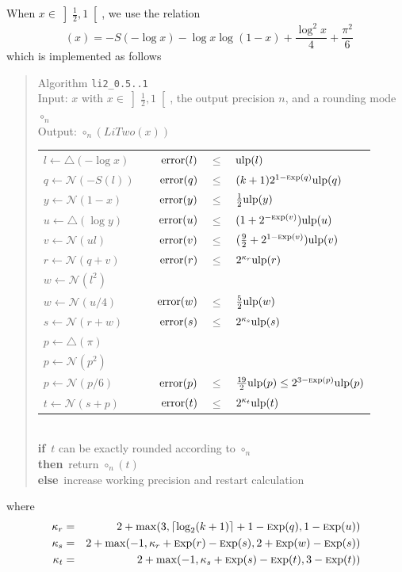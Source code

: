 \documentclass[12pt]{amsart}
\DeclareMathOperator{\LiTwo}{Li_2}
\def\n{\textnormal}
\def\pinf{\bigtriangleup}
\def\ulp{{\rm ulp}}
\def\Exp{{\rm \textsc exp}}
\def\N{{\mathcal N}}
\def\If{{\bf if}}
\def\then{{\bf then}}
\def\Else{{\bf else}}
\begin{document}
When $x \in \left]\frac{1}{2}, 1\right[$, we use the relation
\[
\LiTwo(x) = - S(-\log x) - \log x \log(1 - x) + \frac{\log^2 x}{4}
+ \frac{\pi^2}{6}
\]
which is implemented as follows
\begin{quote}
Algorithm {\tt li2\_0.5..1}\\
Input: $x$ with $x \in \left]\frac{1}{2}, 1\right[$, the output precision $n$,
    and a rounding mode $\circ_n$ \\
Output: $\circ_n(LiTwo(x))$ \\
\begin{tabular}{l c r c l}
$l \leftarrow \pinf(-\log x)$ & & $\n{error}(l) $ & $ \leq $ & $ \ulp(l)$\\
$q \leftarrow \N(-S(l))$ & &
$\n{error}(q) $ & $ \leq $ & $ (k+1)2^{1-\Exp(q)} \ulp(q)$\\

$y \leftarrow \N(1 - x)$ & &
$\n{error}(y) $ & $ \leq $ & $ \frac{1}{2}\ulp(y)$ \\
$u \leftarrow \pinf(\log y)$ & &
$\n{error}(u) $ & $ \leq $ & $(1 + 2^{-\Exp(v)}) \ulp(u)$\\
$v \leftarrow \N(ul)$ & &
$\n{error}(v) $ & $ \leq $ & $(\frac{9}{2} + 2^{1-\Exp(v)}) \ulp(v)$\\
$r \leftarrow \N(q + v)$ & &
$\n{error}(r) $ & $ \leq $ & $2^{\kappa_r}\ulp(r)$\\

$w \leftarrow \N(l^2)$\\
$w \leftarrow \N(u/4)$ & &
$\n{error}(w) $ & $ \leq $ & $ \frac{5}{2} \ulp(w)$\\
$s \leftarrow \N(r + w)$ & &
$\n{error}(s) $ & $ \leq $ & $2^{\kappa_s} \ulp(s)$ \\

$p \leftarrow \pinf(\pi)$ \\
$p \leftarrow \N(p^2)$ \\
$p \leftarrow \N(p/6)$ & &
$\n{error}(p) $ & $ \leq $ & $\frac{19}{2}\ulp(p) \leq 2^{3-\Exp(p)}\ulp(p)$\\
$t \leftarrow \N(s + p)$ & &
$\n{error}(t) $ & $ \leq $ & $2^{\kappa_t} \ulp(t)$
\end{tabular}\\
\If\ $t$ can be exactly rounded according to $\circ_n$\\
\then\ return $\circ_n(t)$\\
\Else\ increase working precision and restart calculation
\end{quote}
where 
\begin{eqnarray*}
\kappa_r & = & 2 + {\rm max}(3, \lceil\log_2(k+1)\rceil + 1 - \Exp(q),
1 - \Exp(u))\\
\kappa_s & = & 2 + {\rm max}(-1, \kappa_r + \Exp(r) - \Exp(s),
2 + \Exp(w) - \Exp(s))\\
\kappa_t & = & 2 + {\rm max}(-1, \kappa_s + \Exp(s) - \Exp(t),
3 - \Exp(t))
\end{eqnarray*}
\end{document}
